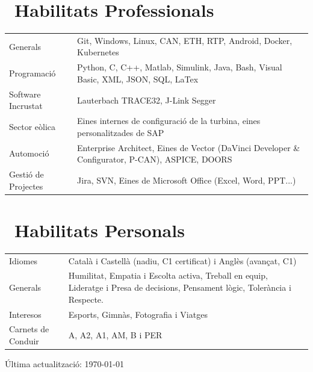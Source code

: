 \documentclass[a4paper,12pt]{article}
\def\icon#1{}%
\def\faCogs{Habilitats}%
\def\faUserFriends{Habilitats Personals}%
\DeclareRobustCommand{\icon}[1]{\raisebox{-0.1\height}{\color{sectioncolor}#1}}
\begin{document}
\section{\texorpdfstring{\icon{\faCogs}\ Habilitats Professionals}{Habilitats Professionals}}
\begin{tabularx}{\linewidth}{@{}l X@{}}
    \icon{\faTools} Generals &  Git, Windows, Linux, CAN, ETH, RTP, Android, Docker, Kubernetes\\
    \icon{\faCode} Programació &  Python, C, C++, Matlab, Simulink, Java, Bash, Visual Basic, XML, JSON, SQL, LaTex\\
    \icon{\faMicrochip} Software Incrustat  &  Lauterbach TRACE32, J-Link Segger\\  
    \icon{\faWind} Sector eòlica &  Eines internes de configuració de la turbina, eines personalitzades de SAP\\  
    \icon{\faCar} Automoció &  Enterprise Architect, Eines de Vector (DaVinci Developer \& Configurator, P-CAN), ASPICE, DOORS\\  
    \icon{\faTasks} Gestió de Projectes &  Jira, SVN, Eines de Microsoft Office (Excel, Word, PPT...)  
\end{tabularx}

\section{\texorpdfstring{\icon{\faUserFriends}\ Habilitats Personals}{Habilitats Personals}}
\begin{tabularx}{\linewidth}{@{}l X@{}}
    \icon{\faLanguage} Idiomes &  Català i Castellà (nadiu, C1 certificat) i Anglès (avançat, C1)\\
    \icon{\faHandshake} Generals &  Humilitat, Empatia i Escolta activa, Treball en equip, Lideratge i Presa de decisions, Pensament lògic, Tolerància i Respecte.\\
    \icon{\faHeart} Interesos  &  Esports, Gimnàs, Fotografia i Viatges\\  
    \icon{\faIdCard} Carnets de Conduir &  A, A2, A1, AM, B i PER
\end{tabularx}

\vfill
\begin{center}
    {\footnotesize \icon{\faSync} Última actualització: \today}
\end{center}
\end{document}
